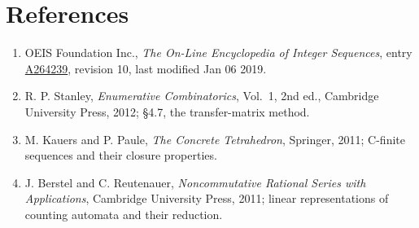 \documentclass[11pt]{article}
\theoremstyle{definition}
\begin{document}
\section{References}

\begin{enumerate}

\item OEIS Foundation Inc., \emph{The On-Line Encyclopedia of Integer Sequences}, entry \href{https://oeis.org/A264239}{A264239}, revision 10, last modified Jan 06 2019.

\item R. P. Stanley, \emph{Enumerative Combinatorics}, Vol.~1, 2nd ed., Cambridge University Press, 2012; \S4.7, the transfer-matrix method.

\item M. Kauers and P. Paule, \emph{The Concrete Tetrahedron}, Springer, 2011; C-finite sequences and their closure properties.

\item J. Berstel and C. Reutenauer, \emph{Noncommutative Rational Series with Applications}, Cambridge University Press, 2011; linear representations of counting automata and their reduction.

\end{enumerate}
\end{document}
